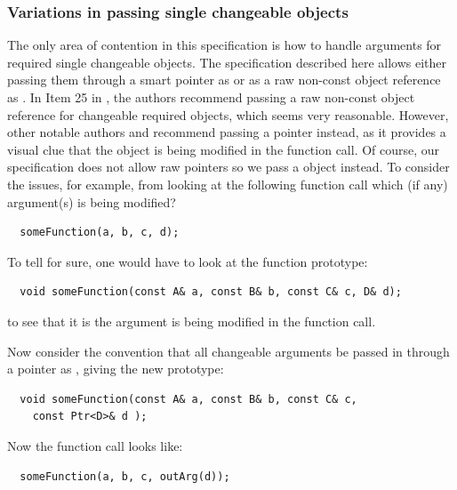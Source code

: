 \documentclass[pdf,ps2pdf,11pt]{SANDreport}
\begin{document}
%
{}\subsubsection*{Variations in passing single changeable objects}
\label{sec:vars-passing-single-objs}
%

The only area of contention in this specification is how to handle
arguments for required single changeable objects.  The specification
described here allows either passing them through a smart pointer as
{} or as a raw non-const object reference as
{}.  In Item 25 in {}\cite{C++CodingStandards05}, the
authors recommend passing a raw non-const object reference
{} for changeable required objects, which seems very
reasonable.  However, other notable authors {}\cite[Section Section
5.5]{stroustrup97} and {}\cite[Section 13.2]{CodeComplete2nd04}
recommend passing a pointer instead, as it provides a visual clue that
the object is being modified in the function call.  Of course, our
specification does not allow raw pointers so we pass a {} object instead.  To consider the issues, for example, from
looking at the following function call which (if any) argument(s) is
being modified?

{\small\begin{verbatim}
  someFunction(a, b, c, d);
\end{verbatim}}

To tell for sure, one would have to look at the function prototype:

{\small\begin{verbatim}
  void someFunction(const A& a, const B& b, const C& c, D& d);
\end{verbatim}}

to see that it is the {} argument is being modified in the
function call.

Now consider the convention that all changeable arguments be passed in
through a pointer as {}, giving the new
prototype:

{\small\begin{verbatim}
  void someFunction(const A& a, const B& b, const C& c,
    const Ptr<D>& d );
\end{verbatim}}

Now the function call looks like:

{\small\begin{verbatim}
  someFunction(a, b, c, outArg(d));
\end{verbatim}}
\end{document}
